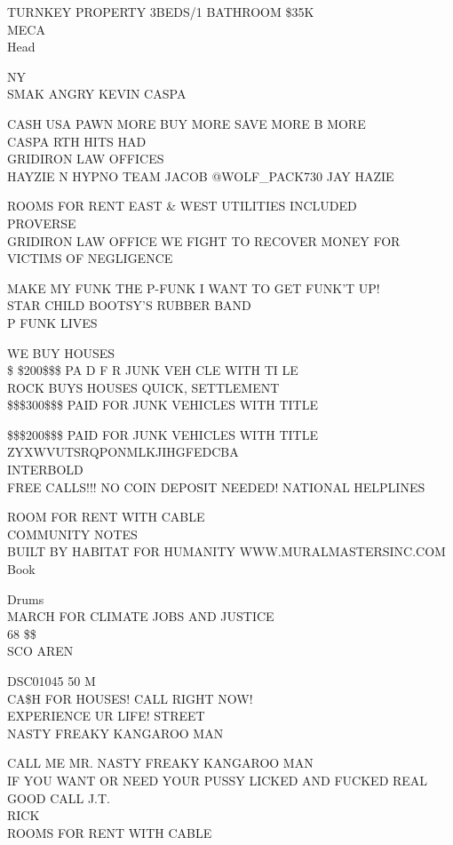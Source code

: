 \documentclass[10pt,letterpaper]{article}
\begin{document}
TURNKEY PROPERTY 3BEDS/1 BATHROOM \$35K\\
MECA\\
Head

NY\\
SMAK ANGRY KEVIN CASPA

CASH USA PAWN MORE BUY MORE SAVE MORE B MORE\\
CASPA RTH HITS HAD\\
GRIDIRON LAW OFFICES\\
HAYZIE N HYPNO TEAM JACOB @WOLF\_PACK730 JAY HAZIE

ROOMS FOR RENT EAST \& WEST UTILITIES INCLUDED\\
PROVERSE\\
GRIDIRON LAW OFFICE WE FIGHT TO RECOVER MONEY FOR VICTIMS OF NEGLIGENCE

MAKE MY FUNK THE P{-}FUNK I WANT TO GET FUNK'T UP!\\
STAR CHILD BOOTSY'S RUBBER BAND\\
P FUNK LIVES

WE BUY HOUSES\\
\$ \$200\$\$\$ PA D F R JUNK VEH CLE WITH TI LE\\
ROCK BUYS HOUSES QUICK, SETTLEMENT\\
\$\$\$300\$\$\$ PAID FOR JUNK VEHICLES WITH TITLE

\$\$\$200\$\$\$ PAID FOR JUNK VEHICLES WITH TITLE\\
ZYXWVUTSRQPONMLKJIHGFEDCBA\\
INTERBOLD\\
FREE CALLS!!! NO COIN DEPOSIT NEEDED!  NATIONAL HELPLINES

ROOM FOR RENT WITH CABLE\\
COMMUNITY NOTES\\
BUILT BY HABITAT FOR HUMANITY WWW.MURALMASTERSINC.COM\\
Book

Drums\\
MARCH FOR CLIMATE JOBS AND JUSTICE\\
68 \$\$\\
SCO AREN

DSC01045 50 M\\
CA\$H FOR HOUSES!  CALL RIGHT NOW!\\
EXPERIENCE UR LIFE! STREET\\
NASTY FREAKY KANGAROO MAN

CALL ME MR. NASTY FREAKY KANGAROO MAN\\
IF YOU WANT OR NEED YOUR PUSSY LICKED AND FUCKED REAL GOOD CALL J.T.\\
RICK\\
ROOMS FOR RENT WITH CABLE
\end{document}
